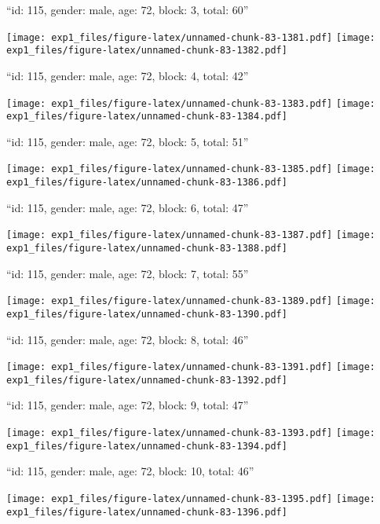 \documentclass[11pt,,]{article}
\begin{document}
\newpage
[1] 

``id: 115, gender: male, age: 72, block: 3, total: 60''

\texttt{[image: exp1\_files/figure-latex/unnamed-chunk-83-1381.pdf]}
\texttt{[image: exp1\_files/figure-latex/unnamed-chunk-83-1382.pdf]}

\newpage
[1] 

``id: 115, gender: male, age: 72, block: 4, total: 42''

\texttt{[image: exp1\_files/figure-latex/unnamed-chunk-83-1383.pdf]}
\texttt{[image: exp1\_files/figure-latex/unnamed-chunk-83-1384.pdf]}

\newpage
[1] 

``id: 115, gender: male, age: 72, block: 5, total: 51''

\texttt{[image: exp1\_files/figure-latex/unnamed-chunk-83-1385.pdf]}
\texttt{[image: exp1\_files/figure-latex/unnamed-chunk-83-1386.pdf]}

\newpage
[1] 

``id: 115, gender: male, age: 72, block: 6, total: 47''

\texttt{[image: exp1\_files/figure-latex/unnamed-chunk-83-1387.pdf]}
\texttt{[image: exp1\_files/figure-latex/unnamed-chunk-83-1388.pdf]}

\newpage
[1] 

``id: 115, gender: male, age: 72, block: 7, total: 55''

\texttt{[image: exp1\_files/figure-latex/unnamed-chunk-83-1389.pdf]}
\texttt{[image: exp1\_files/figure-latex/unnamed-chunk-83-1390.pdf]}

\newpage
[1] 

``id: 115, gender: male, age: 72, block: 8, total: 46''

\texttt{[image: exp1\_files/figure-latex/unnamed-chunk-83-1391.pdf]}
\texttt{[image: exp1\_files/figure-latex/unnamed-chunk-83-1392.pdf]}

\newpage
[1] 

``id: 115, gender: male, age: 72, block: 9, total: 47''

\texttt{[image: exp1\_files/figure-latex/unnamed-chunk-83-1393.pdf]}
\texttt{[image: exp1\_files/figure-latex/unnamed-chunk-83-1394.pdf]}

\newpage
[1] 

``id: 115, gender: male, age: 72, block: 10, total: 46''

\texttt{[image: exp1\_files/figure-latex/unnamed-chunk-83-1395.pdf]}
\texttt{[image: exp1\_files/figure-latex/unnamed-chunk-83-1396.pdf]}
\end{document}
